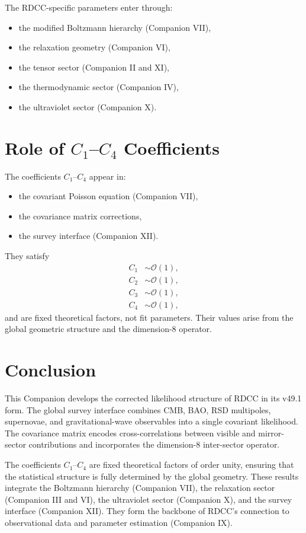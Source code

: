 \documentclass[11pt,a4paper]{article}
\begin{document}
The RDCC-specific parameters enter through:
\begin{itemize}[leftmargin=0.8cm]
  \item the modified Boltzmann hierarchy (Companion VII),
  \item the relaxation geometry (Companion VI),
  \item the tensor sector (Companion II and XI),
  \item the thermodynamic sector (Companion IV),
  \item the ultraviolet sector (Companion X).
\end{itemize}

\section[Role of C coefficients]{Role of $C_1$–$C_4$ Coefficients}

The coefficients $C_1$–$C_4$ appear in:
\begin{itemize}[leftmargin=0.8cm]
  \item the covariant Poisson equation (Companion VII),
  \item the covariance matrix corrections,
  \item the survey interface (Companion XII).
\end{itemize}

They satisfy
\begin{align}
C_1 &\sim \mathcal{O}(1), \\
C_2 &\sim \mathcal{O}(1), \\
C_3 &\sim \mathcal{O}(1), \\
C_4 &\sim \mathcal{O}(1),
\end{align}
and are fixed theoretical factors, not fit parameters. Their values arise from
the global geometric structure and the dimension-8 operator.

\section{Conclusion}

This Companion develops the corrected likelihood structure of RDCC in its
v49.1 form. The global survey interface combines CMB, BAO, RSD multipoles,
supernovae, and gravitational-wave observables into a single covariant
likelihood. The covariance matrix encodes cross-correlations between visible
and mirror-sector contributions and incorporates the dimension-8 inter-sector
operator.

The coefficients $C_1$–$C_4$ are fixed theoretical factors of order unity,
ensuring that the statistical structure is fully determined by the global
geometry. These results integrate the Boltzmann hierarchy (Companion VII), the
relaxation sector (Companion III and VI), the ultraviolet sector (Companion X),
and the survey interface (Companion XII). They form the backbone of RDCC’s
connection to observational data and parameter estimation (Companion IX).
\end{document}
